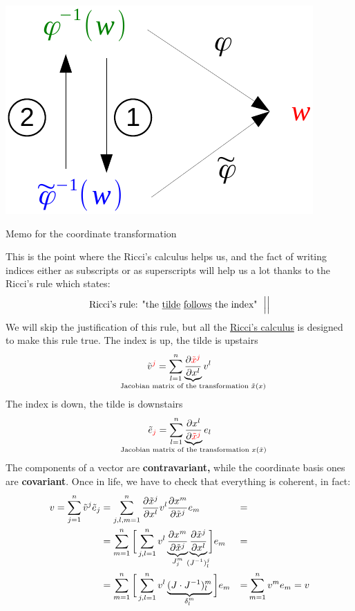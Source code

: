\documentclass[../main.tex]{subfiles}
\begin{document}
\begin{marginfigure}
	\includegraphics{images/memo_trasf.pdf}
	\caption*{Memo for the coordinate transformation}
\end{marginfigure} 
This is the point where the Ricci's calculus helps us, and the fact of writing indices either as subscripts or as superscripts will help us a lot thanks to the Ricci's rule which states:
\[
\mbox{Ricci's rule:  "the \underline{tilde} \underline{follows} the index"
} \ \Big|\Big|
\]
We will skip the justification of this rule, but all the \href{https://en.wikipedia.org/wiki/Ricci_calculus}{Ricci's calculus} is designed to make this rule true. The index is up, the tilde is upstairs
\[
\tilde{v}^{\textcolor{red}{j}}=\sum_{l=1}^n\underbrace{\frac{\partial\textcolor{red}{\tilde{x}^j}}{\partial x^l}}_{\mathclap{\text{Jacobian matrix of the transformation $\tilde{x}(x)$}}}v^l
\]
The index is down, the tilde is downstairs
\[
\tilde{e}_{\textcolor{red}{j}}=\sum_{l=1}^n\underbrace{\frac{\partial x^l}{\partial\textcolor{red}{\tilde{x}^j}}}_{\mathclap{\text{Jacobian matrix of the transformation $x(\tilde{x})$}}}e_l
\]
The components of a vector are \textbf{contravariant,} while the coordinate basis ones are \textbf{covariant}. Once in life, we have to check that everything is coherent, in fact:
\begin{align*}
    v =\sum_{j=1}^n\tilde{v}^j\tilde{e}_j
    &=\sum_{j,l,m=1}^n\frac{\partial\tilde{x}^j}{\partial x^l}v^l\frac{\partial x^m}{\partial \tilde{x}^j}e_m &=&\\
    &=\sum_{m=1}^n\bigg[\sum_{j,l=1}^n v^l\underbrace{\frac{\partial x^m}{\partial\tilde{x}^j}}_{\mathclap{J_j^m}}\underbrace{\frac{\partial\tilde{x}^j}{\partial x^l}}_{\mathclap{(J^{-1})_l^j}}\bigg]e_m &=&\\
    &=\sum_{m=1}^n \bigg[\sum_{j,l=1}^n v^l \underbrace{(J \cdot J^{-1})_l^m}_{\mathclap{\delta_l^m}}\bigg]e_m &=&\sum_{m=1}^n v^m e_m=v
\end{align*}
\end{document}
